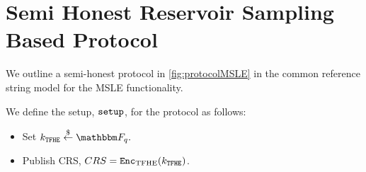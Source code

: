 \section{Semi Honest Reservoir Sampling Based Protocol}
\label{sec:msle_protocol}
\newcommand{\partDecrySet}{\mathcal{P}}
We outline a semi-honest protocol in \cref{fig:protocolMSLE} in the common reference string model for the MSLE functionality.

We define the setup, $\texttt{setup}$, for the protocol as follows:
\begin{itemize}
	\item Set $k_{\texttt{TFHE}} \randomGet \F_q.$
	\item Publish CRS, $CRS = \texttt{Enc}_{\mathrm{TFHE}}(k_{\texttt{TFHE}})$.
\end{itemize}



